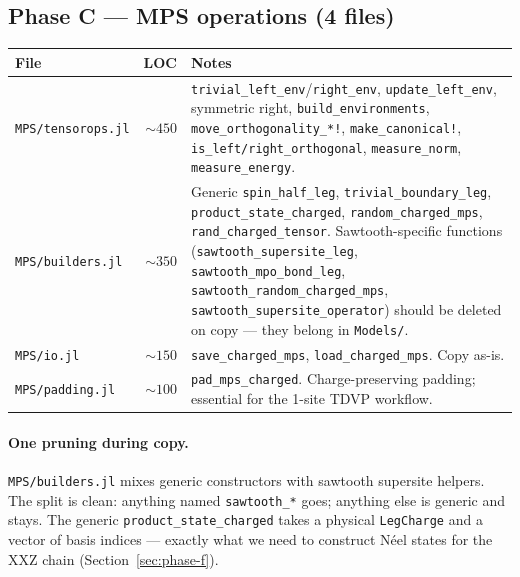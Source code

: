 \documentclass[11pt]{article}
\begin{document}
\subsection{Phase C --- MPS operations (4 files)}
\begin{center}
\begin{tabularx}{\linewidth}{l r X}
\toprule
File & LOC & Notes \\
\midrule
\texttt{MPS/tensorops.jl} & $\sim 450$ & \texttt{trivial\_left\_env}/\texttt{right\_env}, \texttt{update\_left\_env}, symmetric right, \texttt{build\_environments}, \texttt{move\_orthogonality\_*!}, \texttt{make\_canonical!}, \texttt{is\_left/right\_orthogonal}, \texttt{measure\_norm}, \texttt{measure\_energy}. \\
\texttt{MPS/builders.jl} & $\sim 350$ & Generic \texttt{spin\_half\_leg}, \texttt{trivial\_boundary\_leg}, \texttt{product\_state\_charged}, \texttt{random\_charged\_mps}, \texttt{rand\_charged\_tensor}.  Sawtooth-specific functions (\texttt{sawtooth\_supersite\_leg}, \texttt{sawtooth\_mpo\_bond\_leg}, \texttt{sawtooth\_random\_charged\_mps}, \texttt{sawtooth\_supersite\_operator}) should be deleted on copy --- they belong in \texttt{Models/}.\\
\texttt{MPS/io.jl}       & $\sim 150$ & \texttt{save\_charged\_mps}, \texttt{load\_charged\_mps}.  Copy as-is. \\
\texttt{MPS/padding.jl}  & $\sim 100$ & \texttt{pad\_mps\_charged}.  Charge-preserving padding; essential for the 1-site TDVP workflow. \\
\bottomrule
\end{tabularx}
\end{center}

\paragraph{One pruning during copy.}  \texttt{MPS/builders.jl} mixes generic
constructors with sawtooth supersite helpers.  The split is clean: anything
named \texttt{sawtooth\_*} goes; anything else is generic and stays.  The
generic \texttt{product\_state\_charged} takes a physical \texttt{LegCharge}
and a vector of basis indices --- exactly what we need to construct N\'eel
states for the XXZ chain (Section~\ref{sec:phase-f}).
\end{document}
